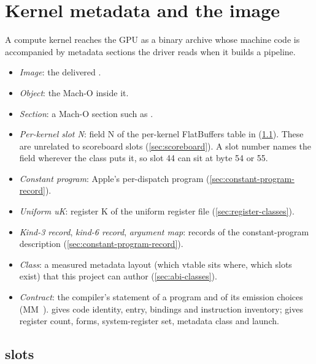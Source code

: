 \chapter{Kernel metadata and the image}\label{ch:kernel-metadata-image}

A compute kernel reaches the GPU as a binary archive whose machine code is accompanied by metadata
sections the driver reads when it builds a pipeline.


\begin{itemize}
\item \emph{Image}: the delivered .
\item \emph{Object}: the  Mach-O inside it.
\item \emph{Section}: a Mach-O section such as .
\item \emph{Per-kernel slot N}: field N of the per-kernel FlatBuffers table in  (\cref{sec:gpu-metadata-slots}).
  These are unrelated to scoreboard slots (\cref{sec:scoreboard}). A slot number names the field wherever the class puts
  it, so slot 44 can sit at byte 54 or 55.
\item \emph{Constant program}: Apple's per-dispatch program  (\cref{sec:constant-program-record}).
\item \emph{Uniform uK}: register K of the uniform register file (\cref{sec:register-classes}).
\item \emph{Kind-3 record}, \emph{kind-6 record}, \emph{argument map}: records of the constant-program description (\cref{sec:constant-program-record}).
\item \emph{Class}: a measured metadata layout (which vtable sits where, which slots exist) that this project can author
  (\cref{sec:abi-classes}).
\item \emph{Contract}: the compiler's statement of a program and of its emission choices (MM~).
   gives code identity, entry, bindings and instruction inventory;  gives
  register count, forms, system-register set, metadata class and launch.
\end{itemize}

\section{ slots}\label{sec:gpu-metadata-slots}

